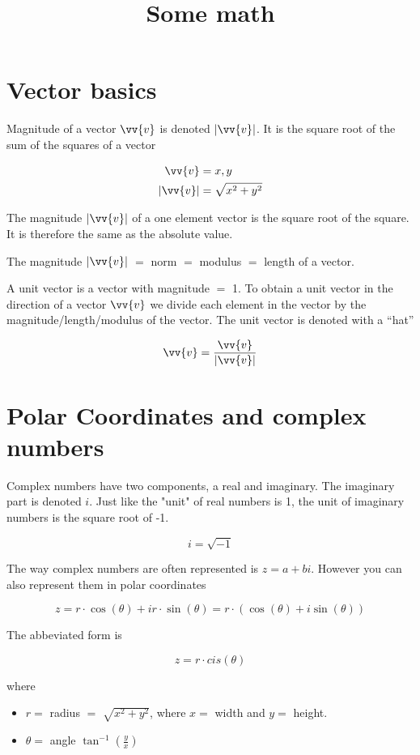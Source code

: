 \documentclass{article}
\title{Some math}
\begin{document}
    \section{Vector basics}

    Magnitude of a vector $\vv{v}$ is denoted $|\vv{v}|$. It is the square root of the sum of the squares of a vector

    \begin{align}
        \vv{v} & = {x, y} \\
        |\vv{v}| & = \sqrt{x^2 + y^2}
        \label{eqn:magnitudeOfAVector}
    \end{align}

    The magnitude $|\vv{v}|$ of a one element vector is the square root of the square. It is therefore the same as the absolute value.

    The magnitude $|\vv{v}|$ $=$ norm $=$ modulus $=$ length of a vector.

    A unit vector is a vector with magnitude $=$ 1. To obtain a unit vector in the direction of a vector $\vv{v}$ we divide each element in the vector by the magnitude/length/modulus of the vector. The unit vector is denoted with a “hat”

    \[ \vv{v} = \frac{\vv{v}}{|\vv{v}|}\]


    \section{Polar Coordinates and complex numbers}

    Complex numbers have two components, a real and imaginary. The imaginary part is denoted $i$. Just like the "unit"
    of real numbers is 1, the unit of imaginary numbers is the square root of -1.

    \begin{equation}
        i = \sqrt{-1}
    \end{equation}

    The way complex numbers are often represented is $z=a+bi$. However you can also represent them in polar coordinates

    \[z=r\cdot\cos(\theta) + i r\cdot\sin(\theta) = r\cdot(\cos(\theta) + i\sin(\theta))\]

    The abbeviated form is

    \[z=r\cdot cis(\theta)\]

    where
    \begin{itemize}
        \item $r = $ radius $=$ $\sqrt{x^2 + y^2}$, where $x = $ width and $y =$ height.
        \item $\theta =$ angle $ \tan^{-1}(\frac{y}{x})$
    \end{itemize}
\end{document}

